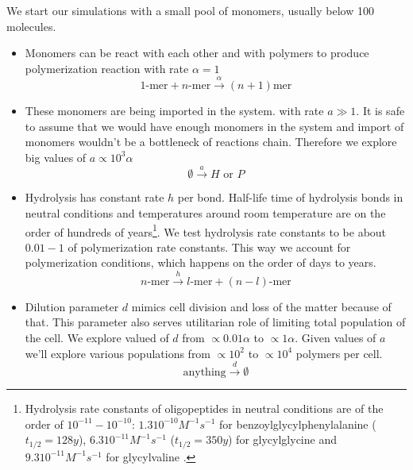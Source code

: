 \documentclass[journal=jacsat,manuscript=article,layout=twocolumn]{achemso}
\newcommand*{\ga}{\alpha}
\begin{document}
We start our simulations with a small pool of monomers, usually below 100 molecules. 
\begin{itemize}
 \item Monomers can be react with each other and with polymers to produce polymerization reaction 
with rate 
$\ga = 1$
\begin{equation}
 1\mbox{-mer}+n\mbox{-mer} \xrightarrow{\ga} (n+1)\mbox{mer}
\end{equation}
\item These monomers are being imported in the system. with rate $a\gg1$. It is safe to assume 
that 
we would have enough monomers in the system and import of monomers wouldn't be a bottleneck of 
reactions chain. Therefore we explore big values of $a\propto 10^3\ga$
\begin{equation}
 \emptyset \xrightarrow{a} H\,\,\mbox{or}\,\,P
\end{equation}

\item Hydrolysis has constant rate $h$ per bond. Half-life time of hydrolysis bonds in neutral 
conditions and temperatures around room temperature are on the order of hundreds of 
years\footnote{Hydrolysis rate constants of oligopeptides in 
neutral conditions are of the order of $10^{-11}-10^{-10}$: $1.3  10^{-10} M^{-1}s^{-1} $ 
for benzoylglycylphenylalanine ($t_{1/2} = 128 y$)\cite{Bryant1996}, $6.3  10^{-11} M^{-1} s^{-1}$
($t_{1/2}=350 y$) for glycylglycine and $9.3 10^{-11}M^{-1} s^{-1}$ for glycylvaline
\cite{Smith1998}.}. We test hydrolysis rate constants to be about $0.01-1$ of polymerization rate 
constants. This way we account for polymerization conditions, which happens on the order of days 
to years.
\begin{equation}
 n\mbox{-mer} \xrightarrow{h} l\mbox{-mer}+(n-l)\mbox{-mer}
\end{equation}



\item Dilution parameter $d$ mimics cell division and loss of the matter because of that. 
This parameter also serves utilitarian role of limiting total population of the cell. We explore 
valued of $d$ from $\propto 0.01\ga$ to $\propto 1\ga$. Given values of $a$ we'll explore various 
populations from $\propto 10^2$ to $\propto 10^4$ polymers per 
cell.
\begin{equation}
 \mbox{anything} \xrightarrow{d}\emptyset
\end{equation}



\end{itemize}
\end{document}

